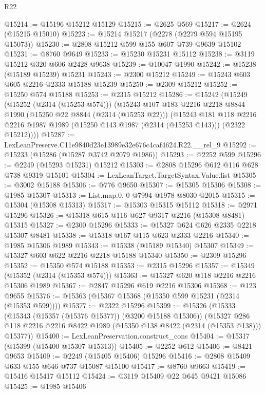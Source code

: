 \begin{lexlean}{R22}
\begin{coremodule}
@15214 := @15196 @15212 @15129
@15215 := @2625 @569
@15217 := @2624 (@15215 @15010)
@15223 := @15214 @15217 (@2278 (@2279 @594 @15195 @15073))
@15230 := @2808 @15212 @599 @155 @607 @739 @9639 @15102
@15231 := @8760 @9649
@15233 := @15230 @15231 @15112
@15238 := @3119 @15212 @320 @606 @2428 @9638
@15239 := @10047 @1990
@15242 := @15238 (@15189 @15239) @15231
@15243 := @2300 @15212
@15249 := @15243 @603 @605 @2216 @2333 @15188 @15239
@15250 := @2309 @15212
@15252 := @15250 @574 @15188
@15253 := @2315 @15212
@15286 := @15242
    (@15249
      (@15252 (@2314 (@15253 @574)))
      (@15243
        @107
        @183
        @2216
        @2218
        @8844
        @1990
        (@15250 @22 @8844 (@2314 (@15253 @22)))
        (@15243
          @181
          @118
          @2216
          @2216
          @1987
          @1989
          (@15250 @143 @1987 (@2314 (@15253 @143)))
          (@2322 @15212))))
@15287 := LexLeanPreserve.C11e9840d23e13989e32e676c4caf4624.R22.__rel_9
@15292 := @15233 (@15286 (@15287 @3742 @2079 @1986))
@15293 := @2252 @599
@15296 := @2249 (@15293 @15231) @15212
@15303 := @2808 @15296 @612 @116 @628 @738 @9319 @15101
@15304 := LexLeanTarget.TargetSyntax.Value.list
@15305 := @3002 @15188
@15306 := @776 @9650
@15307 := @15305 @15306
@15308 := @1985 @15307
@15313 := List.map.{0, 0} @7994 @1978 @8030 @2015
@15315 := @15304 (@15308 @15313)
@15317 := @15303 @15315 @15112
@15318 := @2971 @15296
@15326 := @15318 @615 @116 @627 @9317 @2216 (@15308 @8481) @15315
@15327 := @2300 @15296
@15333 := @15327 @624 @626 @2335 @2218 @15307 @8481
@15338 := @15318 @167 @115 @623 @2333 @2216
@15340 := @1985 @15306 @1989
@15343 := @15338 (@15189 @15340) @15307
@15349 := @15327 @603 @622 @2216 @2218 @15188 @15340
@15350 := @2309 @15296
@15352 := @15350 @574 @15188
@15353 := @2315 @15296
@15357 := @15349 (@15352 (@2314 (@15353 @574)))
@15363 := @15327 @620 @118 @2216 @2216 @15306 @1989
@15367 := @2847 @15296 @619 @2216 @15306
@15368 := @123 @9655
@15376 := @15363 (@15367 @15368 (@15350 @599 @15231 (@2314 (@15353 @599))))
@15377 := @2322 @15296
@15399 := @15326
    (@15333
      (@15343 (@15357 (@15376 @15377)) (@3200 @15188 @15306))
      (@15327 @286 @118 @2216 @2216 @8422 @1989 (@15350 @138 @8422 (@2314 (@15353 @138))) @15377))
@15400 := LexLeanPreservation.construct_cons
@15404 := @15317 (@15399 (@15400 @15307 @15313))
@15405 := @2252 @612
@15406 := @8421 @9653
@15409 := @2249 (@15405 @15406) @15296
@15416 := @2808 @15409 @633 @155 @646 @737 @15087 @15100
@15417 := @8760 @9663
@15419 := @15416 @15417 @15112
@15424 := @3119 @15409 @22 @645 @9421 @15086
@15425 := @1985 @15406

\end{coremodule}
\end{lexlean}
